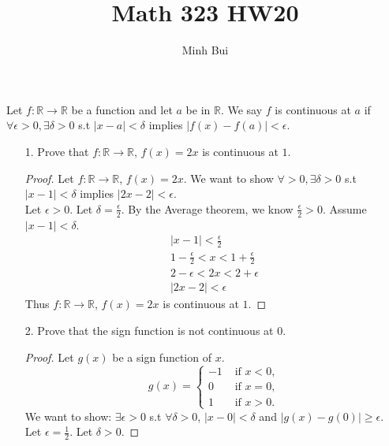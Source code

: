 \documentclass{article}
\author{Minh Bui}
\title{Math 323 HW20}
\theoremstyle{claim}
\theoremstyle{definition}
\begin{document}
\maketitle
Let $f: \mathbb{R} \rightarrow \mathbb{R}$ be a function and let $a$ be in $\mathbb{R}$. We say $f$ is continuous at $a$ if $\forall \epsilon > 0, \exists \delta > 0$ s.t $ |x - a| < \delta$ implies $|f(x) - f(a)| < \epsilon$.
\begin{enumerate}
    \item[1.] Prove that $f: \mathbb{R} \rightarrow \mathbb{R}$, $f(x) = 2x$ is continuous at $1$.
        \begin{proof}
            Let $f: \mathbb{R} \rightarrow \mathbb{R}$, $f(x) = 2x$. We want to show $\forall > 0, \exists \delta > 0$ s.t $|x - 1| < \delta$ implies $|2x - 2| < \epsilon$.\\
            Let $\epsilon > 0$. Let $\delta = \frac{\epsilon}{2}$. By the Average theorem, we know $\frac{\epsilon}{2} > 0$. Assume $|x - 1| < \delta$.
            \begin{gather*}
                |x - 1| < \frac{\epsilon}{2}\\
                1 - \frac{\epsilon}{2} < x < 1 + \frac{\epsilon}{2}\\
                2 - \epsilon < 2x < 2 + \epsilon\\
                |2x - 2| < \epsilon
            \end{gather*}
        Thus $f:\mathbb{R} \rightarrow \mathbb{R}$, $f(x) = 2x$ is continuous at $1$.
    \end{proof}
    \item[2.] Prove that the sign function is not continuous at $0$.
    \begin{proof}
        Let $g(x)$ be a sign function of $x$.
        \begin{equation*}
            g(x) = \left\{
                \begin{array}{rl}
                    -1 & \text{ if } x < 0,\\
                    0 & \text{ if } x = 0,\\
                    1 & \text{ if } x > 0.
                \end{array} \right.
        \end{equation*}
        We want to show: $\exists \epsilon > 0$ s.t $\forall \delta > 0$, $|x - 0| < \delta$ and $ |g(x) - g(0)| \ge \epsilon$.\\
        Let $\epsilon = \frac{1}{2}$. Let $\delta > 0$.
    \end{proof}
\end{enumerate}
\end{document}
